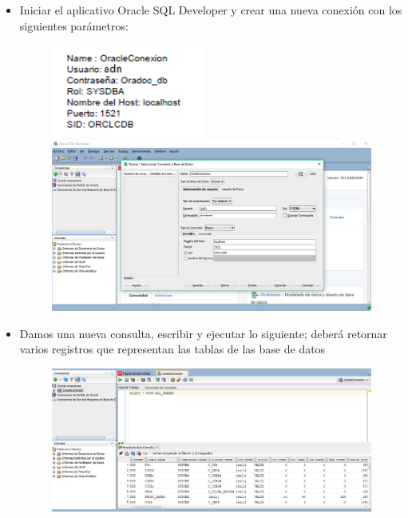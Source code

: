 \begin{itemize}
\begin{figure}[H]
\begin{center}
		\end{center}
		\end{figure}
	\item Iniciar el aplicativo Oracle SQL Developer y crear una nueva conexión con los siguientes parámetros:
		\begin{figure}[H]
		\begin{center}
		\includegraphics[width=5cm]{./Imagenes/t2}
		\includegraphics[width=15cm]{./Imagenes/13}
		\end{center}
		\end{figure}
	\item Damos una  nueva consulta, escribir y ejecutar lo siguiente; deberá retornar varios registros que representan las tablas de las base de datos
		\begin{figure}[H]
		\begin{center}
		\includegraphics[width=15cm]{./Imagenes/14}
		\end{center}
		\end{figure}

\end{itemize}
